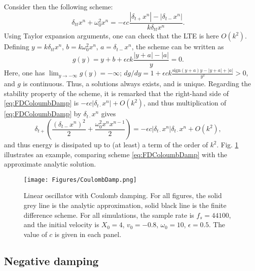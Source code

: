 \documentclass[11pt,twoside,a4paper,english]{book}
\newcommand{\dtp}{\delta_{t+}}
\newcommand{\dtm}{\delta_{t-}}
\newcommand{\dtd}{\delta_{t\cdot}}
\newcommand{\dtt}{\delta_{tt}}
\begin{document}
Consider then the following scheme:
\begin{equation}\label{eq:FDColoumbDamp}
\dtt x^n + \omega_0^2 x^n = - \epsilon c \frac{|\dtp x^n|-|\dtm x^n|}{k\dtt x^n}.
\end{equation}
Using Taylor expansion arguments, one can check that the LTE is here $O(k^2)$. Defining $y=k\dtt x^n$, $b = k\omega_0^2x^n$, $a = \dtm x^n$, the scheme can be written as
\begin{equation}
g(y) = y + b + \epsilon c k \frac{|y+a|-|a|}{y} = 0.
\end{equation}
Here, one has $\lim_{y\rightarrow -\infty}g(y) = -\infty$; $dg/dy = 1 + \epsilon c k \frac{\text{sign}(y+a)y - |y+a|+|a|}{y^2} > 0$, and $g$ is continuous. Thus, a solutions always exists, and is unique. Regarding the stability property of the scheme, it is remarked that the right-hand side of \eqref{eq:FDColoumbDamp} is $-\epsilon c |\dtd x^n|+O(k^2)$, and thus multiplication of \eqref{eq:FDColoumbDamp} by $\dtd x^n$ gives
\begin{equation}
\dtp \left(\frac{(\dtm x^n)^2}{2} + \frac{\omega_0^2 x^n x^{n-1}}{2} \right) = - \epsilon c |\dtd x^n| \dtd x^n +O(k^2), 
\end{equation}
and thus energy is dissipated up to (at least) a term of the order of $k^2$. Fig. \ref{fig:CoulombLossFD} illustrates an example, comparing scheme \eqref{eq:FDColoumbDamp} with the approximate analytic solution. \begin{figure}
\texttt{[image: Figures/CoulombDamp.png]}
\caption{Linear oscillator with Coulomb damping. For all figures, the solid grey line is the analytic approximation, solid black line is the finite difference  scheme. For all simulations, the sample rate is $f_s=44100$, and the initial velocity is $X_0=4$, $v_0=-0.8$, $\omega_0 = 10$, $\epsilon = 0.5$. The value of $c$ is given in each panel.}\label{fig:CoulombLossFD}
\end{figure}

\subsection{Negative damping}
\end{document}
